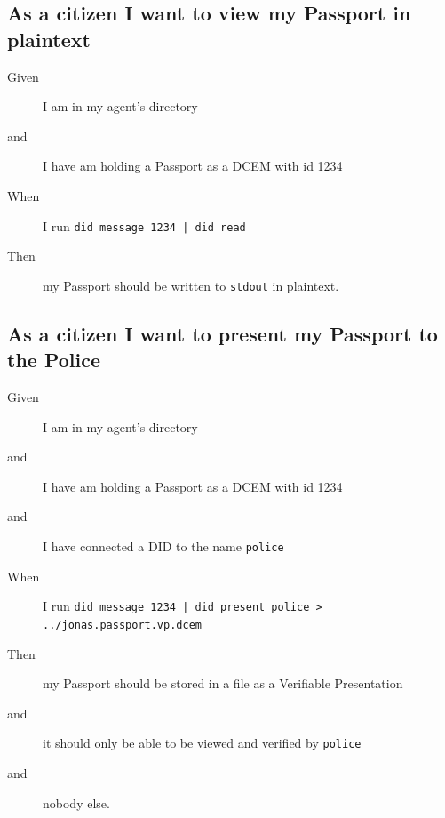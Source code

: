 \subsection{As a citizen I want to view my Passport in plaintext}
\begin{description}
    \item[Given] I am in my agent's directory
    \item[and] I have am holding a Passport as a DCEM with id 1234
    \item[When] I run \texttt{did message 1234 | did read}
    \item[Then] my Passport should be written to \texttt{stdout} in plaintext.
\end{description}



\subsection{As a citizen I want to present my Passport to the Police}
\begin{description}
    \item[Given] I am in my agent's directory
    \item[and] I have am holding a Passport as a DCEM with id 1234
    \item[and] I have connected a DID to the name \texttt{police}
    \item[When] I run \texttt{did message 1234 | did present police > ../jonas.passport.vp.dcem}
    \item[Then] my Passport should be stored in a file as a Verifiable Presentation
    \item[and] it should only be able to be viewed and verified by \texttt{police}
    \item[and] nobody else.
\end{description}



